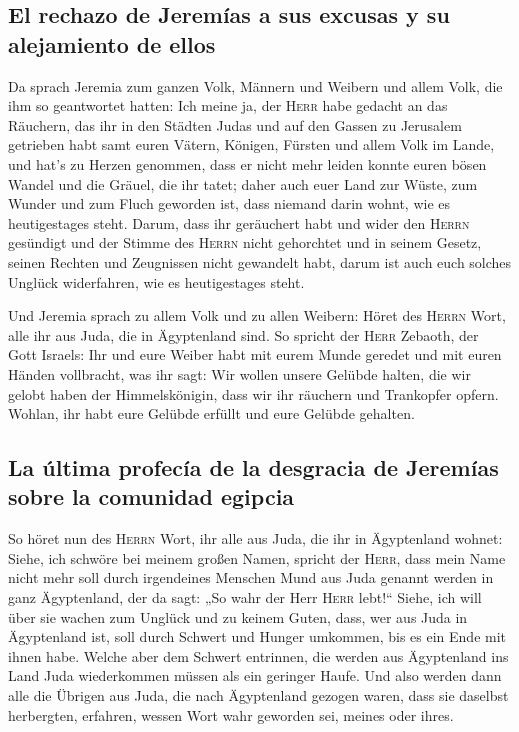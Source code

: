 \hypertarget{el-rechazo-de-jeremuxedas-a-sus-excusas-y-su-alejamiento-de-ellos}{%
\subsection{El rechazo de Jeremías a sus excusas y su alejamiento de
ellos}\label{el-rechazo-de-jeremuxedas-a-sus-excusas-y-su-alejamiento-de-ellos}}

 Da sprach Jeremia zum ganzen Volk, Männern und Weibern
und allem Volk, die ihm so geantwortet hatten:  Ich meine
ja, der \textsc{Herr} habe gedacht an das Räuchern, das ihr in den
Städten Judas und auf den Gassen zu Jerusalem getrieben habt samt euren
Vätern, Königen, Fürsten und allem Volk im Lande, und hat's zu Herzen
genommen,  dass er nicht mehr leiden konnte euren bösen
Wandel und die Gräuel, die ihr tatet; daher auch euer Land zur Wüste,
zum Wunder und zum Fluch geworden ist, dass niemand darin wohnt, wie es
heutigestages steht.  Darum, dass ihr geräuchert habt und
wider den \textsc{Herrn} gesündigt und der Stimme des \textsc{Herrn}
nicht gehorchtet und in seinem Gesetz, seinen Rechten und Zeugnissen
nicht gewandelt habt, darum ist auch euch solches Unglück widerfahren,
wie es heutigestages steht.

 Und Jeremia sprach zu allem Volk und zu allen Weibern:
Höret des \textsc{Herrn} Wort, alle ihr aus Juda, die in Ägyptenland
sind.  So spricht der \textsc{Herr} Zebaoth, der Gott
Israels: Ihr und eure Weiber habt mit eurem Munde geredet und mit euren
Händen vollbracht, was ihr sagt: Wir wollen unsere Gelübde halten, die
wir gelobt haben der Himmelskönigin, dass wir ihr räuchern und
Trankopfer opfern. Wohlan, ihr habt eure Gelübde erfüllt und eure
Gelübde gehalten.

\hypertarget{la-uxfaltima-profecuxeda-de-la-desgracia-de-jeremuxedas-sobre-la-comunidad-egipcia}{%
\subsection{La última profecía de la desgracia de Jeremías sobre la
comunidad
egipcia}\label{la-uxfaltima-profecuxeda-de-la-desgracia-de-jeremuxedas-sobre-la-comunidad-egipcia}}

 So höret nun des \textsc{Herrn} Wort, ihr alle aus Juda,
die ihr in Ägyptenland wohnet: Siehe, ich schwöre bei meinem großen
Namen, spricht der \textsc{Herr}, dass mein Name nicht mehr soll durch
irgendeines Menschen Mund aus Juda genannt werden in ganz Ägyptenland,
der da sagt: „So wahr der Herr \textsc{Herr} lebt!{}`` 
Siehe, ich will über sie wachen zum Unglück und zu keinem Guten, dass,
wer aus Juda in Ägyptenland ist, soll durch Schwert und Hunger umkommen,
bis es ein Ende mit ihnen habe.  Welche aber dem Schwert
entrinnen, die werden aus Ägyptenland ins Land Juda wiederkommen müssen
als ein geringer Haufe. Und also werden dann alle die Übrigen aus Juda,
die nach Ägyptenland gezogen waren, dass sie daselbst herbergten,
erfahren, wessen Wort wahr geworden sei, meines oder ihres.

